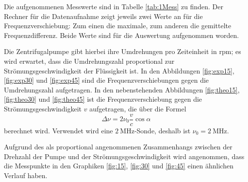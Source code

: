Die aufgenommenen Messwerte sind in Tabelle \ref{tab:1Mess} zu finden. 
Der Rechner für die Datenaufnahme zeigt jeweils zwei Werte an für die Frequenzverschiebung: Zum einen die maximale, zum 
anderen die gemittelte Frequenzdifferenz. 
Beide Werte sind für die Auswertung aufgenommen worden. 

Die Zentrifugalpumpe gibt hierbei ihre Umdrehungen pro Zeiteinheit in $\mathrm{rpm}$; es wird erwartet, dass die Umdrehungszahl 
proportional zur Strömungsgeschwindigkeit der Flüssigkeit ist. 
In den Abbildungen \ref{fig:exp15}, \ref{fig:exp30} und \ref{fig:exp45} sind die Frequenzverschiebungen gegen die Umdrehungszahl aufgetragen. 
In den nebenstehenden Abbildungen \ref{fig:theo15}, \ref{fig:theo30} und \ref{fig:theo45} ist die Frequenzverschiebung 
gegen die Strömungsgeschwindigkeit $v$ aufgetragen, die über die Formel 
\begin{equation*}
    \Delta \nu=2 \nu_0 \frac{v}{c} \cos \alpha
\end{equation*}
berechnet wird. Verwendet wird eine $\SI{2}{\mega\hertz}$-Sonde, deshalb ist $\nu_0=\SI{2}{\mega\hertz}$. 

Aufgrund des als proportional angenommenen Zusammenhangs zwischen der Drehzahl der Pumpe und der Strömungsgeschwindigkeit 
wird angenommen, dass die Messpunkte in den Graphiken \ref{fig:15}, \ref{fig:30} und \ref{fig:45} einen ähnlichen Verlauf haben. 

